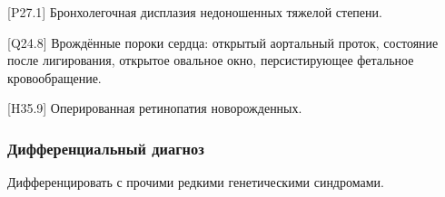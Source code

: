 \documentclass[a4paper,14pt]{extarticle}
\newcommand{\DS}[2]{[#2] #1}
\begin{document}
\DS{Бронхолегочная дисплазия недоношенных тяжелой степени}{P27.1}.

\DS{Врождённые пороки сердца}{Q24.8}: открытый аортальный проток, состояние после лигирования, открытое овальное окно, персистирующее фетальное кровообращение. 

\DS{Оперированная ретинопатия новорожденных}{H35.9}.

\subsubsection*{Дифференциальный диагноз}

Дифференцировать с прочими редкими генетическими синдромами.

\end{document}
